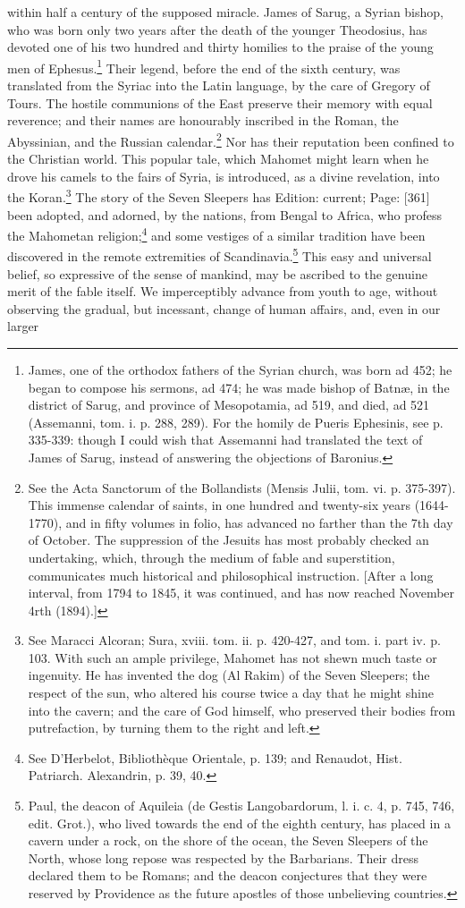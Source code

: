 within half a century of the supposed miracle. James of Sarug, a Syrian bishop, who was born only two years after the death of the younger Theodosius, has devoted one of his two hundred and thirty homilies to the praise of the young men of Ephesus.\footnote{James, one of the orthodox fathers of the Syrian church, was born ad 452; he began to compose his sermons, ad 474; he was made bishop of Batnæ, in the district of Sarug, and province of Mesopotamia, ad 519, and died, ad 521 (Assemanni, tom. i. p. 288, 289). For the homily de Pueris Ephesinis, see p. 335-339: though I could wish that Assemanni had translated the text of James of Sarug, instead of answering the objections of Baronius.} Their legend, before the end of the sixth century, was translated from the Syriac into the Latin language, by the care of Gregory of Tours. The hostile communions of the East preserve their memory with equal reverence; and their names are honourably inscribed in the Roman, the Abyssinian, and the Russian calendar.\footnote{See the Acta Sanctorum of the Bollandists (Mensis Julii, tom. vi. p. 375-397). This immense calendar of saints, in one hundred and twenty-six years (1644-1770), and in fifty volumes in folio, has advanced no farther than the 7th day of October. The suppression of the Jesuits has most probably checked an undertaking, which, through the medium of fable and superstition, communicates much historical and philosophical instruction. [After a long interval, from 1794 to 1845, it was continued, and has now reached November 4rth (1894).]} Nor has their reputation been confined to the Christian world. This popular tale, which Mahomet might learn when he drove his camels to the fairs of Syria, is introduced, as a divine revelation, into the Koran.\footnote{See Maracci Alcoran; Sura, xviii. tom. ii. p. 420-427, and tom. i. part iv. p. 103. With such an ample privilege, Mahomet has not shewn much taste or ingenuity. He has invented the dog (Al Rakim) of the Seven Sleepers; the respect of the sun, who altered his course twice a day that he might shine into the cavern; and the care of God himself, who preserved their bodies from putrefaction, by turning them to the right and left.} The story of the Seven Sleepers has Edition: current; Page: [361] been adopted, and adorned, by the nations, from Bengal to Africa, who profess the Mahometan religion;\footnote{See D\texthebrew{}’Herbelot, Bibliothèque Orientale, p. 139; and Renaudot, Hist. Patriarch. Alexandrin, p. 39, 40.} and some vestiges of a similar tradition have been discovered in the remote extremities of Scandinavia.\footnote{Paul, the deacon of Aquileia (de Gestis Langobardorum, l. i. c. 4, p. 745, 746, edit. Grot.), who lived towards the end of the eighth century, has placed in a cavern under a rock, on the shore of the ocean, the Seven Sleepers of the North, whose long repose was respected by the Barbarians. Their dress declared them to be Romans; and the deacon conjectures that they were reserved by Providence as the future apostles of those unbelieving countries.} This easy and universal belief, so expressive of the sense of mankind, may be ascribed to the genuine merit of the fable itself. We imperceptibly advance from youth to age, without observing the gradual, but incessant, change of human affairs, and, even in our larger 